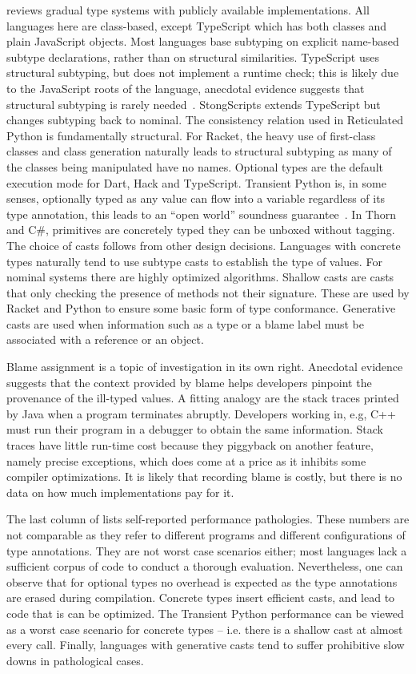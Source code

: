 \documentclass[a4paper,USenglish]{tex/lipics-v2016}
\begin{document}
\noindent
{} reviews gradual type systems with publicly available
implementations. All languages here are class-based, except TypeScript which
has both classes and plain JavaScript objects. Most languages base subtyping
on explicit name-based subtype declarations, rather than on structural
similarities.  TypeScript uses structural subtyping, but does not implement
a runtime check; this is likely due to the JavaScript roots of the language,
anecdotal evidence suggests that structural subtyping is rarely
needed~\cite{ecoop15}. StongScripts extends TypeScript but changes subtyping
back to nominal.  The consistency relation used in Reticulated Python is
fundamentally structural.  For Racket, the heavy use of first-class classes
and class generation naturally leads to structural subtyping as many of the
classes being manipulated have no names.  Optional types are the default
execution mode for Dart, Hack and TypeScript.  Transient Python is, in some
senses, optionally typed as any value can flow into a variable regardless of
its type annotation, this leads to an ``open world'' soundness
guarantee~\cite{siek14}.  In Thorn and C\#, primitives are concretely
typed they can be unboxed without tagging.  The choice of casts follows from
other design decisions. Languages with concrete types naturally tend to use
subtype casts to establish the type of values. For nominal systems there are
highly optimized algorithms. Shallow casts are casts that only checking the
presence of methods not their signature. These are used by Racket and Python
to ensure some basic form of type conformance. Generative casts are used
when information such as a type or a blame label must be associated with a
reference or an object.

Blame assignment is a topic of investigation in its own right. Anecdotal
evidence suggests that the context provided by blame helps developers
pinpoint the provenance of the ill-typed values. A fitting analogy are the
stack traces printed by Java when a program terminates abruptly. Developers
working in, e.g, C++ must run their program in a debugger to obtain the same
information. Stack traces have little run-time cost because they piggyback
on another feature, namely precise exceptions, which does come at a price as
it inhibits some compiler optimizations. It is likely that recording blame
is costly, but there is no data on how much implementations pay for it.

The last column of  lists self-reported performance
pathologies.  These numbers are not comparable as they refer to different
programs and different configurations of type annotations. They are not
worst case scenarios either; most languages lack a sufficient corpus of code
to conduct a thorough evaluation.  Nevertheless, one can observe that for
optional types no overhead is expected as the type annotations are erased
during compilation. Concrete types insert efficient casts, and lead to code
that is can be optimized.  The Transient Python performance can be viewed as
a worst case scenario for concrete types -- i.e. there is a shallow cast at
almost every call. Finally, languages with generative casts tend to suffer
prohibitive slow downs in pathological cases.
\end{document}
